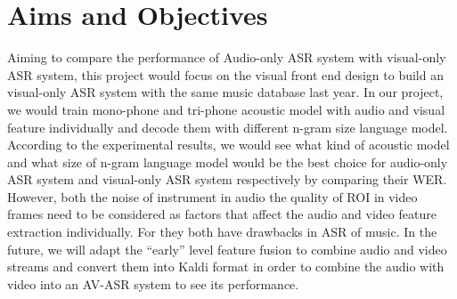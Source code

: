 \section{Aims and Objectives}
Aiming to compare the performance of  Audio-only ASR system with visual-only ASR system, this project would focus on the visual front end design to build an visual-only ASR system with the same music database last year.  In our project, we would train mono-phone and tri-phone acoustic model with audio and visual feature individually and decode them with different n-gram size language model. According to the experimental results, we would see what kind of acoustic model and what size of n-gram language model would be the best choice for audio-only ASR system and visual-only ASR system respectively by comparing their WER. However, both the noise of instrument in audio the quality of ROI in video frames need to be considered as factors that affect the audio and video feature extraction individually. For they both have drawbacks in ASR of music. In the future,  we will adapt the “early” level feature fusion to combine audio and video streams and convert them into Kaldi format in order to combine the audio with video into an AV-ASR system to see its performance. 
 


